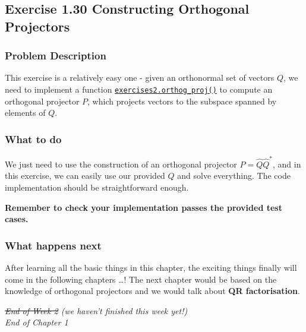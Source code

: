 \subsection*{Exercise 1.30 Constructing Orthogonal Projectors}
\subsubsection*{Problem Description}%
This exercise is a relatively easy one - given an orthonormal set of vectors $Q$, we need to implement a function \href{https://comp-lin-alg.github.io/cla_utils.html#cla_utils.exercises2.orthog_proj}{\texttt{exercises2.orthog\_proj()}} to compute an orthogonal projector $P$, which projects vectors to the subspace spanned by elements of  $Q$.
\subsubsection*{What to do}%
We just need to use the construction of an orthogonal projector $P = \hat{Q}\hat{Q}^*$, and in this exercise, we can easily use our provided $Q$ and solve everything. The code implementation should be straightforward enough. \medskip

\noindent \textbf{Remember to check your implementation passes the provided test cases.}
\subsubsection*{What happens next}%
\noindent After learning all the basic things in this chapter, the exciting things finally will come in the following chapters \ldots! The next chapter would be based on the knowledge of orthogonal projectors and we would talk about \textbf{QR factorisation}. 

\bigskip

\begin{center}
  \textit{\large \st{End of Week 2} (we haven't finished this week yet!)} \\
  \medskip
  \textit{\large End of Chapter 1}
\end{center}




